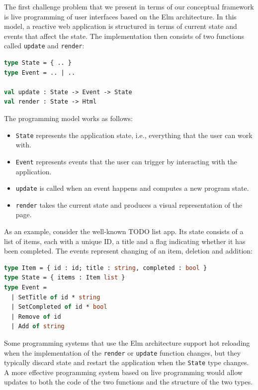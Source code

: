 \documentclass[english,submission]{programming}
\begin{document}
The first challenge problem that we present in terms of our conceptual framework is live programming
of user interfaces based on the Elm architecture. In this model, a reactive web application is
structured in terms of current state and events that affect the state. The implementation then
consists of two functions called \texttt{update} and \texttt{render}:

\begin{lstlisting}[language=ml,morekeywords={on}]
type State = { .. }
type Event = .. | ..

val update : State -> Event -> State
val render : State -> Html
\end{lstlisting}

\noindent
The programming model works as follows:

\begin{itemize}
\setlength\itemsep{0em}
\item \texttt{State} represents the application state, i.e., everything that the user can work with.
\item \texttt{Event} represents events that the user can trigger by interacting with the application.
\item \texttt{update} is called when an event happens and computes a new program state.
\item \texttt{render} takes the current state and produces a visual representation of the page.
\end{itemize}

\noindent
As an example, consider the well-known TODO list app. Its state consists of a list of items,
each with a unique ID, a title and a flag indicating whether it has been completed.
The events represent changing of an item, deletion and addition:

\begin{lstlisting}[language=ml]
type Item = { id : id; title : string, completed : bool }
type State = { items : Item list }
type Event =
  | SetTitle of id * string
  | SetCompleted of id * bool
  | Remove of id
  | Add of string
\end{lstlisting}

\noindent
Some programming systems that use the Elm architecture support hot reloading when the
implementation of the \texttt{render} or \texttt{update} function changes, but they typically
discard state and restart the application when the \texttt{State} type changes. A more effective
programming system based on live programming would allow updates to both the code of the two
functions and the structure of the two types.
\end{document}
